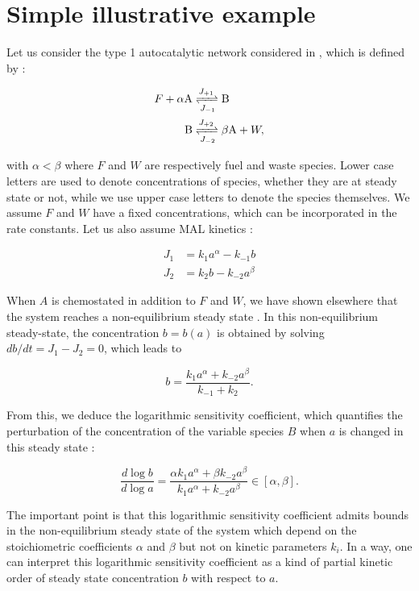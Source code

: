 \documentclass{article}
\begin{document}
	\section{Simple illustrative example}
	Let us consider the type 1 autocatalytic network considered in \cite{4}, which is defined by :
	\begin{center}
		\begin{equation}
			\label{ex1}
			\begin{aligned}
				F+\alpha \mathrm{A} &\xrightleftharpoons[J_{-1}]{J_{+1}}\mathrm{B}\\
				\mathrm{B} &\xrightleftharpoons[J_{-2}]{J_{+2}}\beta \mathrm{A}+W,
			\end{aligned}
		\end{equation}
	\end{center}
	with $\alpha < \beta$ where $F$ and $W$ are respectively fuel and waste species. Lower case letters are used to denote concentrations of species, whether they are at steady state or not, while we use upper case letters to denote the species themselves. We assume $F$ and $W$ have a fixed concentrations, which can be incorporated in the rate constants.
	Let us also assume MAL kinetics :
	\begin{center}
		\begin{equation}
			\begin{aligned}
				J_1 &= k_1 a^{\alpha} - k_{-1} b \\
				J_2 &= k_2 b - k_{-2} a^{\beta}
			\end{aligned}
			\label{13}
		\end{equation}
	\end{center}
	
	When $A$ is chemostated in addition to $F$ and $W$, we have shown elsewhere that the system reaches a non-equilibrium steady state \cite{4}. In this non-equilibrium steady-state, the concentration $b=b(a)$ is obtained by solving $db/dt=J_1-J_2=0$, which leads to 
	\begin{center}
		\begin{equation}
			\label{b_SS}
			b= \frac{k_1 a^{\alpha}+k_{-2} a^{\beta}}{k_{-1}+k_2}.
		\end{equation}
	\end{center}
	From this, we deduce the logarithmic sensitivity coefficient, which quantifies the perturbation of the concentration of the variable species $B$ when $a$ is changed in this steady state  :
	\begin{center}
		\begin{equation}
			\label{eq:bound_A_chem}
			\frac{d\log b}{d \log a}= \frac{\alpha k_1 a^{\alpha}+\beta k_{-2} a^{\beta}}{k_{1} a^{\alpha}+k_{-2} a^{\beta}} \in [\alpha, \beta].
		\end{equation}
	\end{center}
	The important point is that this logarithmic sensitivity coefficient admits bounds in the non-equilibrium steady state of the system which depend on the stoichiometric coefficients $\alpha$ and $\beta$ but not on kinetic parameters $k_i$. In a way, one can interpret this logarithmic sensitivity coefficient as a kind of partial kinetic order of steady state concentration $b$ with respect to $a$.
	
\end{document}
